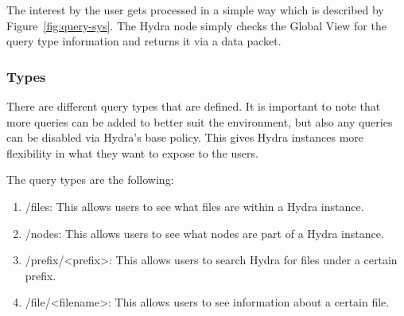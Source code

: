 The interest by the user gets processed in a simple way which is described by Figure~\ref{fig:query-sys}. The Hydra node simply checks the Global View for the query type information and returns it via a data packet.


\subsubsection{Types}
There are different query types that are defined. It is important to note that more queries can be added to better suit the environment, but also any queries can be disabled via Hydra's base policy. This gives Hydra instances more flexibility in what they want to expose to the users.

The query types are the following:
\begin{enumerate}
    \item /files: This allows users to see what files are within a Hydra instance. 
    \item /nodes: This allows users to see what nodes are part of a Hydra instance. 
    \item /prefix/<prefix>: This allows users to search Hydra for files under a certain prefix.
    \item /file/<filename>: This allows users to see information about a certain file.
\end{enumerate}